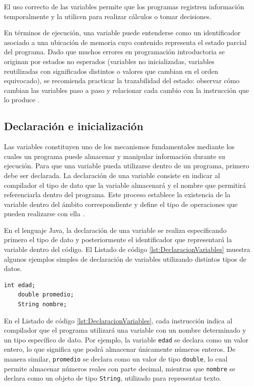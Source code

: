 \documentclass[12pt,twoside]{book}
\begin{document}
				El uso correcto de las variables permite que los programas registren información temporalmente y la utilicen para realizar cálculos o tomar decisiones.
				
				En términos de ejecución, una variable puede entenderse como un identificador asociado a una ubicación de memoria cuyo contenido representa el estado parcial del programa. Dado que muchos errores en programación introductoria se originan por estados no esperados (variables no inicializadas, variables reutilizadas con significados distintos o valores que cambian en el orden equivocado), se recomienda practicar la trazabilidad del estado: observar cómo cambian las variables paso a paso y relacionar cada cambio con la instrucción que lo produce \cite{Lister2004Learning,Qian2018Students}.

				\subsection{Declaración e inicialización}
					\noindent
					Las variables constituyen uno de los mecanismos fundamentales mediante los cuales un programa puede almacenar y manipular información durante su ejecución. Para que una variable pueda utilizarse dentro de un programa, primero debe ser declarada. La declaración de una variable consiste en indicar al compilador el tipo de dato que la variable almacenará y el nombre que permitirá referenciarla dentro del programa. Este proceso establece la existencia de la variable dentro del ámbito correspondiente y define el tipo de operaciones que pueden realizarse con ella \cite{Sebesta2018Concepts,Pierce2002Types}.
					
					En el lenguaje Java, la declaración de una variable se realiza especificando primero el tipo de dato y posteriormente el identificador que representará la variable dentro del código. El Listado de código \ref{lst:DeclaracionVariables} muestra algunos ejemplos simples de declaración de variables utilizando distintos tipos de datos.
					
					\begin{lstlisting}[style=Java,caption={Ejemplos de declaración de variables en Java.},label={lst:DeclaracionVariables}]
	int edad;
	double promedio;
	String nombre;
					\end{lstlisting}
					
					\noindent
					En el Listado de código \ref{lst:DeclaracionVariables}, cada instrucción indica al compilador que el programa utilizará una variable con un nombre determinado y un tipo específico de dato. Por ejemplo, la variable \texttt{edad} se declara como un valor entero, lo que significa que podrá almacenar únicamente números enteros. De manera similar, \texttt{promedio} se declara como un valor de tipo \texttt{double}, lo cual permite almacenar números reales con parte decimal, mientras que \texttt{nombre} se declara como un objeto de tipo \texttt{String}, utilizado para representar texto.
					
\end{document}
